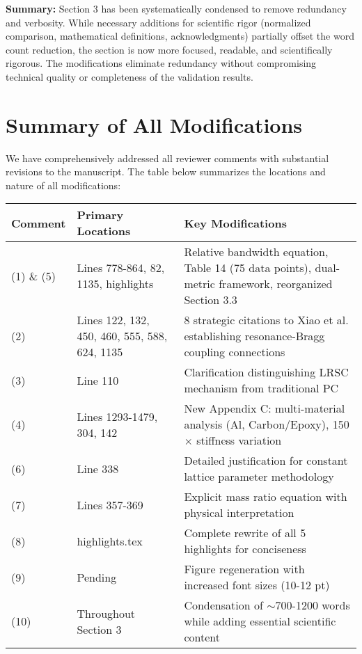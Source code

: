 \documentclass[11pt,a4paper]{article}
\begin{document}
\textbf{Summary:} Section 3 has been systematically condensed to remove redundancy and verbosity. While necessary additions for scientific rigor (normalized comparison, mathematical definitions, acknowledgments) partially offset the word count reduction, the section is now more focused, readable, and scientifically rigorous. The modifications eliminate redundancy without compromising technical quality or completeness of the validation results.

\newpage

\section*{Summary of All Modifications}

We have comprehensively addressed all reviewer comments with substantial revisions to the manuscript. The table below summarizes the locations and nature of all modifications:

\begin{table}[h]
\centering
\small
\begin{tabular}{|p{2cm}|p{4cm}|p{7cm}|}
\hline
\textbf{Comment} & \textbf{Primary Locations} & \textbf{Key Modifications} \\
\hline
(1) \& (5) & Lines 778-864, 82, 1135, highlights & Relative bandwidth equation, Table 14 (75 data points), dual-metric framework, reorganized Section 3.3 \\
\hline
(2) & Lines 122, 132, 450, 460, 555, 588, 624, 1135 & 8 strategic citations to Xiao et al. establishing resonance-Bragg coupling connections \\
\hline
(3) & Line 110 & Clarification distinguishing LRSC mechanism from traditional PC \\
\hline
(4) & Lines 1293-1479, 304, 142 & New Appendix C: multi-material analysis (Al, Carbon/Epoxy), 150$\times$ stiffness variation \\
\hline
(6) & Line 338 & Detailed justification for constant lattice parameter methodology \\
\hline
(7) & Lines 357-369 & Explicit mass ratio equation with physical interpretation \\
\hline
(8) & highlights.tex & Complete rewrite of all 5 highlights for conciseness \\
\hline
(9) & Pending & Figure regeneration with increased font sizes (10-12 pt) \\
\hline
(10) & Throughout Section 3 & Condensation of $\sim$700-1200 words while adding essential scientific content \\
\hline
\end{tabular}
\end{table}
\end{document}
